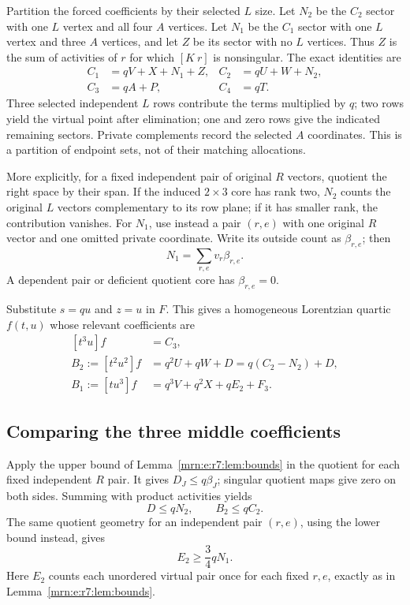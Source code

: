 \documentclass[11pt,a4paper]{article}
\theoremstyle{remark}\newtheorem{remark}[theorem]{Remark}
\begin{document}
Partition the forced coefficients by their selected $L$ size. Let $N_2$ be the $C_2$ sector with one $L$ vertex and all four $A$ vertices. Let $N_1$ be the $C_1$ sector with one $L$ vertex and three $A$ vertices, and let $Z$ be its sector with no $L$ vertices. Thus $Z$ is the sum of activities of $r$ for which $[K\ r]$ is nonsingular. The exact identities are
\begin{equation}\label{mrn:e:r7:eq:sectors}
 \begin{aligned}
 C_1&=qV+X+N_1+Z, & C_2&=qU+W+N_2,\\
 C_3&=qA+P, & C_4&=qT.
 \end{aligned}
\end{equation}
Three selected independent $L$ rows contribute the terms multiplied by $q$; two rows yield the virtual point after elimination; one and zero rows give the indicated remaining sectors. Private complements record the selected $A$ coordinates. This is a partition of endpoint sets, not of their matching allocations.

More explicitly, for a fixed independent pair of original $R$ vectors, quotient the right space by their span. If the induced $2\times3$ core has rank two, $N_2$ counts the original $L$ vectors complementary to its row plane; if it has smaller rank, the contribution vanishes. For $N_1$, use instead a pair $(r,e)$ with one original $R$ vector and one omitted private coordinate. Write its outside count as $\beta_{r,e}$; then
\begin{equation}\label{mrn:e:r7:eq:N1}
 N_1=\sum_{r,e}v_r\beta_{r,e}.
\end{equation}
A dependent pair or deficient quotient core has $\beta_{r,e}=0$.

Substitute $s=qu$ and $z=u$ in $F$. This gives a homogeneous Lorentzian quartic $f(t,u)$ whose relevant coefficients are
\begin{equation}\label{mrn:e:r7:eq:B}
 \begin{aligned}
 [t^3u]f&=C_3,\\
 B_2:=[t^2u^2]f&=q^2U+qW+D=q(C_2-N_2)+D,\\
 B_1:=[tu^3]f&=q^3V+q^2X+qE_2+F_3.
 \end{aligned}
\end{equation}

\subsection{Comparing the three middle coefficients}
Apply the upper bound of Lemma~\ref{mrn:e:r7:lem:bounds} in the quotient for each fixed independent $R$ pair. It gives $D_J\le q\beta_J$; singular quotient maps give zero on both sides. Summing with product activities yields
\begin{equation}\label{mrn:e:r7:eq:upperB}
 D\le qN_2,\qquad B_2\le qC_2.
\end{equation}
The same quotient geometry for an independent pair $(r,e)$, using the lower bound instead, gives
\begin{equation}\label{mrn:e:r7:eq:E2}
 E_2\ge\frac34qN_1.
\end{equation}
Here $E_2$ counts each unordered virtual pair once for each fixed $r,e$, exactly as in Lemma~\ref{mrn:e:r7:lem:bounds}.
\end{document}
